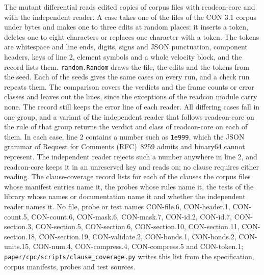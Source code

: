 \documentclass[preprint,12pt]{elsarticle}
\begin{document}
The mutant differential reads edited copies of corpus files with readcon-core and with the independent reader.
A case takes one of the \mutantFiles{} files of the CON 3.1 corpus under \mutantMaxBytes{} bytes and makes one to three edits at random places: it inserts a token, deletes one to eight characters or replaces one character with a token.
The tokens are whitespace and line ends, digits, signs and JSON punctuation, component headers, keys of line 2, element symbols and a whole velocity block, and the record lists them.
\texttt{random.Random} draws the file, the edits and the tokens from the seed.
Each of the \mutantSeeds{} seeds gives the same \mutantPerSeed{} cases on every run, and a check run repeats them.
The comparison covers the verdicts and the frame counts or error classes and leaves out the lines, since the exceptions of the readcon module carry none.
The record still keeps the error line of each reader.
All \mutantDiffer{} differing cases fall in one group, and a variant of the independent reader that follows readcon-core on the rule of that group returns the verdict and class of readcon-core on each of them.
In each case, line 2 contains a number such as \texttt{1e999}, which the JSON grammar of Request for Comments (RFC)~8259 admits and binary64 cannot represent.
The independent reader rejects such a number anywhere in line 2, and readcon-core keeps it in an unreserved key and reads on; no clause requires either reading.
The clause-coverage record lists for each of the \clauseTotal{} clauses the corpus files whose manifest entries name it, the probes whose rules name it, the tests of the library whose names or documentation name it and whether the independent reader names it.
No file, probe or test names CON-file.6, CON-header.1, CON-count.5, CON-count.6, CON-mask.6, CON-mask.7, CON-id.2, CON-id.7, CON-section.3, CON-section.5, CON-section.6, CON-section.10, CON-section.11, CON-section.18, CON-section.19, CON-validate.2, CON-bonds.1, CON-bonds.2, CON-units.15, CON-num.4, CON-compress.4, CON-compress.5 and CON-token.1; \texttt{paper/cpc/scripts/clause\_coverage.py} writes this list from the specification, corpus manifests, probes and test sources.

\begin{footnotesize}  \end{footnotesize}




\end{document}
